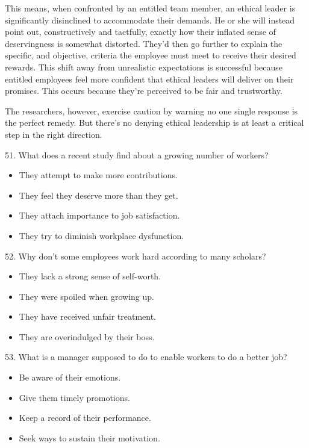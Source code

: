 \documentclass[UTF8,11pt]{ctexart}
\begin{document}
This means, when confronted by an entitled team member, an ethical leader is significantly disinclined to accommodate their demands. He or she will instead point out, constructively and tactfully, exactly how their inflated sense of deservingness is somewhat distorted. They'd then go further to explain the specific, and objective, criteria the employee must meet to receive their desired rewards. This shift away from unrealistic expectations is successful because entitled employees feel more confident that ethical leaders will deliver on their promises. This occurs because they're perceived to be fair and trustworthy.


The researchers, however, exercise caution by warning no one single response is the perfect remedy. But there's no denying ethical leadership is at least a critical step in the right direction.


51. What does a recent study find about a growing number of workers?


\begin{itemize}[leftmargin=2em,itemsep=.2em,topsep=.4em]\item[A.] They attempt to make more contributions.
\item[B.] They feel they deserve more than they get.
\item[C.] They attach importance to job satisfaction.
\item[D.] They try to diminish workplace dysfunction.
\end{itemize}

52. Why don't some employees work hard according to many scholars?


\begin{itemize}[leftmargin=2em,itemsep=.2em,topsep=.4em]\item[A.] They lack a strong sense of self-worth.
\item[B.] They were spoiled when growing up.
\item[C.] They have received unfair treatment.
\item[D.] They are overindulged by their boss.
\end{itemize}

53. What is a manager supposed to do to enable workers to do a better job?


\begin{itemize}[leftmargin=2em,itemsep=.2em,topsep=.4em]\item[A.] Be aware of their emotions.
\item[B.] Give them timely promotions.
\item[C.] Keep a record of their performance.
\item[D.] Seek ways to sustain their motivation.
\end{itemize}
\end{document}
